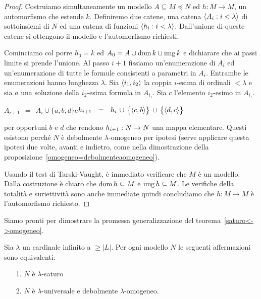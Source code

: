 \begin{proof}
Costruiamo simultaneamente un modello $A\subseteq M\preceq N$ ed $h:M\to M$, un automorfismo che estende $k$. Definiremo due catene, una catena $\langle A_i:i<\lambda\rangle$ di sottoinsiemi di $N$ ed una catena di funzioni $\langle h_i:i<\lambda\rangle$. Dall'unione di queste catene si ottengono il modello e l'automorfismo richiesti.

Cominciamo col porre $h_0=k$ ed $A_0=A\cup\mathop{\rm dom} k\cup\mathop{\rm img} k$ e dichiarare che ai passi limite si prende l'unione. Al passo $i+1$ fissiamo un'enumerazione di $A_i$ ed un'enumerazione di tutte le formule consistenti a parametri in $A_i$. Entrambe le enumerazioni hanno lunghezza $\lambda$.  Sia $\langle i_1,i_2\rangle$ la coppia $i$-esima di ordinali $<\lambda$ e sia $a$ una soluzione della $i_2$-esima formula in $A_{i_1}$. Sia $c$ l'elemento $i_2$-esimo in $A_{i_1}$.

\hfil $A_{i+1}\ \ =\ \ A_i\cup\big\{a,b,d\big\}$\hfil  e\hfil  $h_{i+1}\ \ =\ \ h_i\,\cup\,\big\{\<c,b\>\big\}\,\cup\,\big\{\<d,c\>\big\}$ 

per opportuni $b$ e $d$ che rendono $h_{i+1}:N\rightarrow N$ una mappa elementare. Questi esistono perch\'e $N$ \`e debolmente $\lambda$-omogeneo per ipotesi (serve applicare questa ipotesi due volte, avanti e indietro, come nella dimostrazione della proposizione~\ref{omogeneo=debolmenteaomogeneo}).

Usando il test di Tarski-Vaught, \`e immediato verificare che $M$ \`e un modello. Dalla costruzione \`e chiaro che $\mathop{\rm dom} h\subseteq M$ e $\mathop{\rm img} h\subseteq M$. Le verifiche della totalit\`a e suriettivit\`a sono anche immediate quindi concludiamo che $h:M\to M$ \`e l'automorfismo richiesto.
\end{proof}


Siamo pronti per dimostrare la promessa generalizzazione del teorema~\ref{saturo<->omogeneo}.


\begin{theorem}\label{saturo=universaledebolmenteomogeneo}
Sia $\lambda$ un cardinale infinito a $\ge|L|$.  Per ogni modello $N$ le seguenti affermazioni sono equivalenti:
\begin{itemize}
\item[1.] $N$ \`e $\lambda$-saturo
\item[2.] $N$ \`e $\lambda$-universale e debolmente $\lambda$-omogeneo.
\end{itemize}
\end{theorem}

